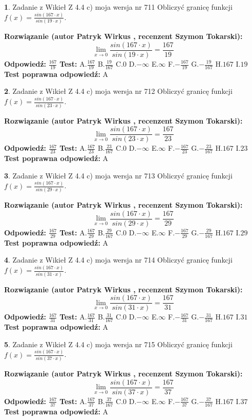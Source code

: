 \documentclass[12pt, a4paper]{article}
\theoremstyle{definition} %
\newtheorem{zad}{}
\newcommand{\zadStart}[1]{\begin{zad}#1\newline}
\newcommand{\zadStop}{\end{zad}}
\newcommand{\rozwStart}[2]{\noindent \textbf{Rozwiązanie (autor #1 , recenzent #2): }\newline}
\newcommand{\rozwStop}{\newline}
\newcommand{\odpStart}{\noindent \textbf{Odpowiedź:}\newline}
\newcommand{\odpStop}{\newline}
\newcommand{\testStart}{\noindent \textbf{Test:}\newline}
\newcommand{\testStop}{\newline}
\newcommand{\kluczStart}{\noindent \textbf{Test poprawna odpowiedź:}\newline}
\newcommand{\kluczStop}{\newline}
\begin{document}
\zadStart{Zadanie z Wikieł Z 4.4 c) moja wersja nr 711}
Obliczyć granicę funkcji $f(x)=\frac{sin(167\cdot x)}{sin(19\cdot x)}$.
\zadStop
\rozwStart{Patryk Wirkus}{Szymon Tokarski}
$$\lim\limits_{x\to 0}\frac{sin(167\cdot x)}{sin(19\cdot x)}=
\frac{167}{19}$$
\rozwStop
\odpStart
$\frac{167}{19}$
\odpStop
\testStart
A.$\frac{167}{19}$
B.$\frac{19}{167}$
C.$0$
D.$-\infty$
E.$\infty$
F.$-\frac{167}{19}$
G.$-\frac{19}{167}$
H.$167$
I.$19$
\testStop
\kluczStart
A
\kluczStop



\zadStart{Zadanie z Wikieł Z 4.4 c) moja wersja nr 712}
Obliczyć granicę funkcji $f(x)=\frac{sin(167\cdot x)}{sin(23\cdot x)}$.
\zadStop
\rozwStart{Patryk Wirkus}{Szymon Tokarski}
$$\lim\limits_{x\to 0}\frac{sin(167\cdot x)}{sin(23\cdot x)}=
\frac{167}{23}$$
\rozwStop
\odpStart
$\frac{167}{23}$
\odpStop
\testStart
A.$\frac{167}{23}$
B.$\frac{23}{167}$
C.$0$
D.$-\infty$
E.$\infty$
F.$-\frac{167}{23}$
G.$-\frac{23}{167}$
H.$167$
I.$23$
\testStop
\kluczStart
A
\kluczStop



\zadStart{Zadanie z Wikieł Z 4.4 c) moja wersja nr 713}
Obliczyć granicę funkcji $f(x)=\frac{sin(167\cdot x)}{sin(29\cdot x)}$.
\zadStop
\rozwStart{Patryk Wirkus}{Szymon Tokarski}
$$\lim\limits_{x\to 0}\frac{sin(167\cdot x)}{sin(29\cdot x)}=
\frac{167}{29}$$
\rozwStop
\odpStart
$\frac{167}{29}$
\odpStop
\testStart
A.$\frac{167}{29}$
B.$\frac{29}{167}$
C.$0$
D.$-\infty$
E.$\infty$
F.$-\frac{167}{29}$
G.$-\frac{29}{167}$
H.$167$
I.$29$
\testStop
\kluczStart
A
\kluczStop



\zadStart{Zadanie z Wikieł Z 4.4 c) moja wersja nr 714}
Obliczyć granicę funkcji $f(x)=\frac{sin(167\cdot x)}{sin(31\cdot x)}$.
\zadStop
\rozwStart{Patryk Wirkus}{Szymon Tokarski}
$$\lim\limits_{x\to 0}\frac{sin(167\cdot x)}{sin(31\cdot x)}=
\frac{167}{31}$$
\rozwStop
\odpStart
$\frac{167}{31}$
\odpStop
\testStart
A.$\frac{167}{31}$
B.$\frac{31}{167}$
C.$0$
D.$-\infty$
E.$\infty$
F.$-\frac{167}{31}$
G.$-\frac{31}{167}$
H.$167$
I.$31$
\testStop
\kluczStart
A
\kluczStop



\zadStart{Zadanie z Wikieł Z 4.4 c) moja wersja nr 715}
Obliczyć granicę funkcji $f(x)=\frac{sin(167\cdot x)}{sin(37\cdot x)}$.
\zadStop
\rozwStart{Patryk Wirkus}{Szymon Tokarski}
$$\lim\limits_{x\to 0}\frac{sin(167\cdot x)}{sin(37\cdot x)}=
\frac{167}{37}$$
\rozwStop
\odpStart
$\frac{167}{37}$
\odpStop
\testStart
A.$\frac{167}{37}$
B.$\frac{37}{167}$
C.$0$
D.$-\infty$
E.$\infty$
F.$-\frac{167}{37}$
G.$-\frac{37}{167}$
H.$167$
I.$37$
\testStop
\kluczStart
A
\kluczStop
\end{document}
